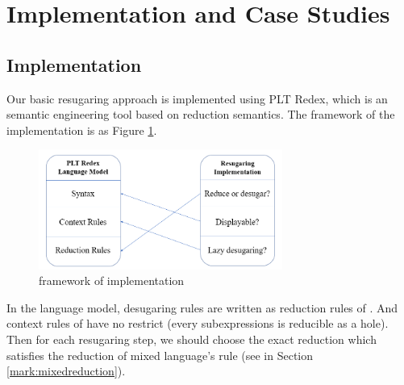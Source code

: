 \section{Implementation and Case Studies}
\label{sec5}

\subsection{Implementation}

Our basic resugaring approach is implemented using PLT Redex\cite{SEwPR}, which is an semantic engineering tool based on reduction semantics\cite{reduction}. The framework of the implementation is as Figure \ref{fig:frame}.

\begin{figure}[thb]
	\centering
	\includegraphics[width=8cm]{images/frame.png}
	\caption{framework of implementation}
	\label{fig:frame}
\end{figure}

In the language model, desugaring rules are written as reduction rules of . And context rules of  have no restrict (every subexpressions is reducible as a hole). Then for each resugaring step, we should choose the exact reduction which satisfies the reduction of mixed language's rule (see in Section \ref{mark:mixedreduction}).

